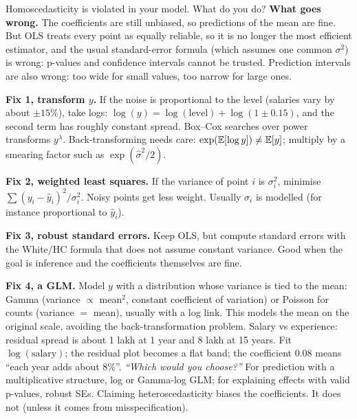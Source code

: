 \begin{qa}{ Homoscedasticity is violated in your model. What do you do?}
\why
\textbf{What goes wrong.} The coefficients are still unbiased, so predictions of the mean are fine. But OLS treats
every point as equally reliable, so it is no longer the most efficient estimator, and the usual standard-error
formula (which assumes one common $\sigma^2$) is wrong: p-values and confidence intervals cannot be trusted.
Prediction intervals are also wrong: too wide for small values, too narrow for large ones.

\textbf{Fix 1, transform $y$.} If the noise is proportional to the level (salaries vary by about $\pm15\%$), take
logs: $\log(y) = \log(\text{level}) + \log(1\pm0.15)$, and the second term has roughly constant spread. Box--Cox
searches over power transforms $y^\lambda$. Back-transforming needs care: $\exp(\mathbb{E}[\log y]) \ne \mathbb{E}[y]$; multiply by
a smearing factor such as $\exp(\hat\sigma^2/2)$.

\textbf{Fix 2, weighted least squares.} If the variance of point $i$ is $\sigma_i^2$, minimise
$\sum (y_i - \hat y_i)^2/\sigma_i^2$. Noisy points get less weight. Usually $\sigma_i$ is modelled (for instance
proportional to $\hat y_i$).

\textbf{Fix 3, robust standard errors.} Keep OLS, but compute standard errors with the White/HC formula that does
not assume constant variance. Good when the goal is inference and the coefficients themselves are fine.

\textbf{Fix 4, a GLM.} Model $y$ with a distribution whose variance is tied to the mean: Gamma (variance $\propto$
mean$^2$, constant coefficient of variation) or Poisson for counts (variance $=$ mean), usually with a log link.
This models the mean on the original scale, avoiding the back-transformation problem.
\worked Salary vs experience: residual spread is about 1 lakh at 1 year and 8 lakh at 15 years. Fit
$\log(\text{salary})$; the residual plot becomes a flat band; the coefficient $0.08$ means ``each year adds about 8\%''.
\pushes \emph{``Which would you choose?''} For prediction with a multiplicative structure, log or Gamma-log GLM; for
explaining effects with valid p-values, robust SEs.
\pitfall Claiming heteroscedasticity biases the coefficients. It does not (unless it comes from misspecification).
\end{qa}

